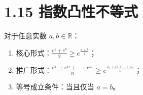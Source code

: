 \documentclass{article}
\begin{document}
\section*{1.15 指数凸性不等式}
对于任意实数 \( a,b \in \mathbb{R} \)：
\begin{enumerate}
    \item 核心形式：\( \frac{e^a+e^b}{2} \geq e^{\frac{a+b}{2}} \)；
    \item 推广形式：\( \frac{e^{x_1}+e^{x_2}+\dots+e^{x_n}}{n} \geq e^{\frac{x_1+x_2+\dots+x_n}{n}} \)；
    \item 等号成立条件：当且仅当 \( a=b \)。
\end{enumerate}
\end{document}
